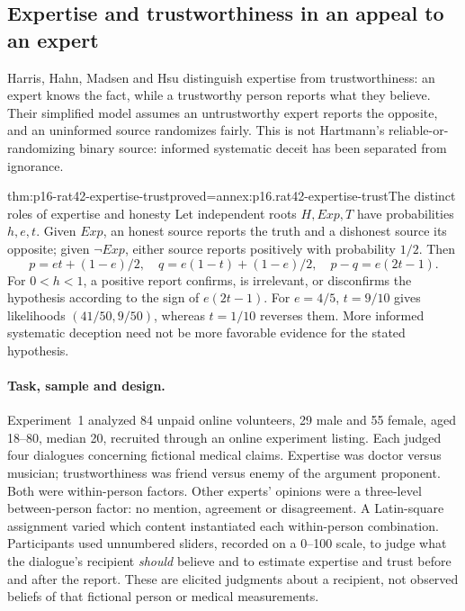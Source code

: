 \subsection{Expertise and trustworthiness in an appeal to an expert}
\label{sec:p16-rat42-expert-study}

Harris, Hahn, Madsen and Hsu distinguish expertise from trustworthiness:
an expert knows the fact, while a trustworthy person reports what they
believe. Their simplified model assumes an untrustworthy expert reports
the opposite, and an uninformed source randomizes fairly. This is not
Hartmann's reliable-or-randomizing binary source: informed systematic
deceit has been separated from ignorance.
\cite[accepted manuscript, pp.~12--16]{HarrisHahnMadsenHsu2016Expert}

\begin{hblemma}{thm:p16-rat42-expertise-trust}{proved=annex:p16.rat42-expertise-trust}{The distinct roles of expertise and honesty}
Let independent roots \(H,Exp,T\) have probabilities
\(h,e,t\). Given \(Exp\), an honest source reports the truth and
a dishonest source its opposite; given \(\neg Exp\), either
source reports positively with probability \(1/2\). Then
\[
 p=et+(1-e)/2,\quad q=e(1-t)+(1-e)/2,
 \quad p-q=e(2t-1).
\]
For \(0<h<1\), a positive report confirms, is irrelevant, or
disconfirms the hypothesis according to the sign of \(e(2t-1)\).
For \(e=4/5\), \(t=9/10\) gives likelihoods \((41/50,9/50)\),
whereas \(t=1/10\) reverses them. More informed systematic deception
need not be more favorable evidence for the stated hypothesis.
\end{hblemma}

\paragraph{Task, sample and design.}
Experiment~1 analyzed 84 unpaid online volunteers, 29 male and 55 female,
aged 18--80, median 20, recruited through an online experiment listing.
Each judged four dialogues concerning fictional medical claims.
Expertise was doctor versus musician; trustworthiness was friend versus
enemy of the argument proponent. Both were within-person factors.
Other experts' opinions were a three-level between-person factor:
no mention, agreement or disagreement. A Latin-square assignment varied
which content instantiated each within-person combination.
Participants used unnumbered sliders, recorded on a 0--100 scale,
to judge what the dialogue's recipient \emph{should} believe and to
estimate expertise and trust before and after the report. These are
elicited judgments about a recipient, not observed beliefs of that
fictional person or medical measurements.
\cite[accepted manuscript, pp.~16--20]{HarrisHahnMadsenHsu2016Expert}

